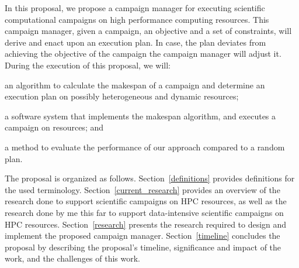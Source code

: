 In this proposal, we propose a campaign manager for executing scientific computational campaigns on high performance computing resources.
This campaign manager, given a campaign, an objective and a set of constraints, will derive and enact upon an execution plan. In case, the plan deviates from achieving the objective of the campaign the campaign manager will adjust it.
During the execution of this proposal, we will:
\begin{inparaenum}[(1)]
\item an algorithm to calculate the makespan of a campaign and determine an execution plan on possibly heterogeneous and dynamic resources;
\item a software system that implements the makespan algorithm, and executes a campaign on resources; and 
\item a method to evaluate the performance of our approach compared to a random plan. 
\end{inparaenum}

The proposal is organized as follows.
Section~\ref{definitions} provides definitions for the used terminology.
Section~\ref{current_research} provides an overview of the research done to support scientific campaigns on HPC resources, as well as the research done by me this far to support data-intensive scientific campaigns on HPC resources.
Section~\ref{research} presents the research required to design and implement the proposed campaign manager.
Section~\ref{timeline} concludes the proposal by describing the proposal's timeline, significance and impact of the work, and the challenges of this work.